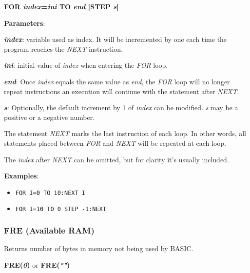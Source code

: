    \hspace{1.9cm}\textbf{FOR \textit{index}=\textit{ini} TO \textit{end} 
    [STEP \textit{s}]}

    \textbf{Parameters}:

    \hspace{1cm}\textbf{\textit{index}}: variable used as index. It will be
    incremented by one each time the program reaches the \textit{NEXT}
    instruction.

    \hspace{1cm}\textbf{\textit{ini}}: initial value of \textit{index} when
    entering the \textit{FOR} loop.

    \hspace{1cm}\textbf{\textit{end}}: Once \textit{index} equals the same value
    as \textit{end}, the \textit{FOR} loop will no longer repeat instructions an
    execution will continue with the statement after \textit{NEXT}.

    \hspace{1cm}\textbf{\textit{s}}: Optionally, the default increment by 1 of
    \textit{index} can be modified. \textit{s} may be a positive or a negative
    number.

    The statement \textit{NEXT} marks the last instruction of each loop. In
    other words, all statements placed between \textit{FOR} and \textit{NEXT}
    will be repeated at each loop.

    The \textit{index} after \textit{NEXT} can be omitted, but for clarity it's
    usually included.

    \textbf{Examples}:
    \begin{itemize}
        \item \texttt{FOR I=0 TO 10:NEXT I}
        \item \texttt{FOR I=10 TO 0 STEP -1:NEXT}
    \end{itemize}

    \subsubsection{{FRE (Available RAM)}}
    \label{msbasic:lang:fre}
    Returns number of bytes in memory not being used by BASIC.

    \hspace{1.9cm}\textbf{FRE(\textit{0})} or \textbf{FRE(\textit{""})}

